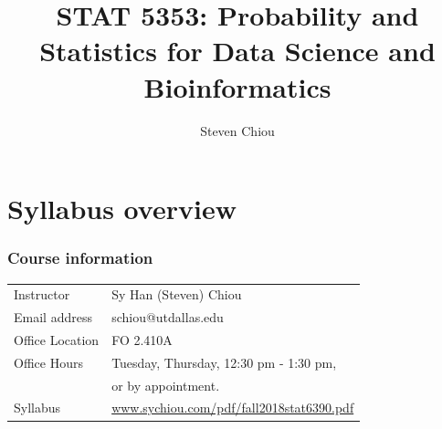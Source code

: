 \documentclass{beamer}
\title[STAT 5353.001]{STAT 5353: Probability and Statistics for Data Science and Bioinformatics}
\author[Steven Chiou]{Steven Chiou}
\institute[UTD]{Department of Mathematical Sciences, \\ University of Texas at Dallas}
\date{}
\begin{document}
\begin{frame}
  \titlepage
\end{frame}

\bgroup
{}




\section{Syllabus overview}
\begin{frame}
\frametitle{Course information}
\begin{center}
\begin{tabular}{p{} p{}}
Instructor & Sy Han (Steven) Chiou\\
Email address & schiou@utdallas.edu\\
Office Location & FO 2.410A\\
Office Hours & Tuesday, Thursday, 12:30 pm - 1:30 pm, \\
&or by appointment.\\
Syllabus & {\scriptsize\url{www.sychiou.com/pdf/fall2018stat6390.pdf}}
\end{tabular}
\end{center}
\end{frame}
\end{document}
